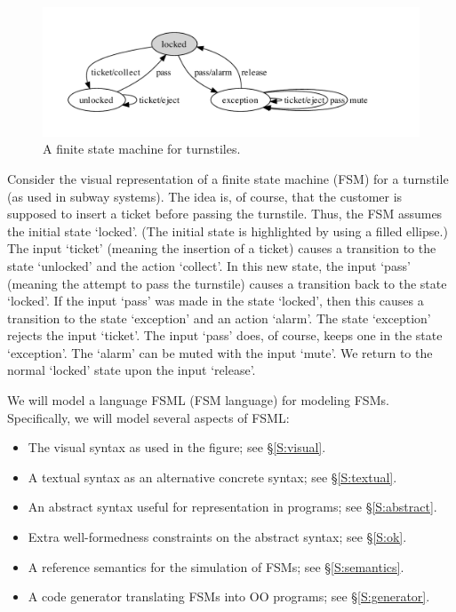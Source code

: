 \documentclass[preprint,authoryear,12pt]{noelsarticle}
\begin{document}

\begin{figure}[t!]
\vspace{-77\in}
\includegraphics[width=\textwidth]{../../languages/fsml/sample-turnstile.pdf}
\vspace{-150\in}
\caption{A finite state machine for turnstiles.}
\label{F:turnstile}
\end{figure}


Consider the visual representation of a finite state machine (FSM) for
a turnstile (as used in subway systems). The idea is, of course, that
the customer is supposed to insert a ticket before passing the
turnstile. Thus, the FSM assumes the initial state `locked'. (The
initial state is highlighted by using a filled ellipse.) The input
`ticket' (meaning the insertion of a ticket) causes a transition to
the state `unlocked' and the action `collect'. In this new state, the
input `pass' (meaning the attempt to pass the turnstile) causes a
transition back to the state `locked'. If the input `pass' was made in
the state `locked', then this causes a transition to the state
`exception' and an action `alarm'. The state `exception' rejects the
input `ticket'. The input `pass' does, of course, keeps one in the
state `exception'. The `alarm' can be muted with the input `mute'. We
return to the normal `locked' state upon the input `release'.

We will model a language FSML (FSM language) for modeling
FSMs. Specifically, we will model several aspects of FSML:

\begin{itemize}
\item The visual syntax as used in the figure; see \S\ref{S:visual}.
\item A textual syntax as an alternative concrete syntax; see \S\ref{S:textual}.
\item An abstract syntax useful for representation in programs; see \S\ref{S:abstract}.
\item Extra well-formedness constraints on the abstract syntax; see \S\ref{S:ok}.
\item A reference semantics for the simulation of FSMs; see \S\ref{S:semantics}.
\item A code generator translating FSMs into OO programs; see \S\ref{S:generator}.
\end{itemize}
\end{document}
